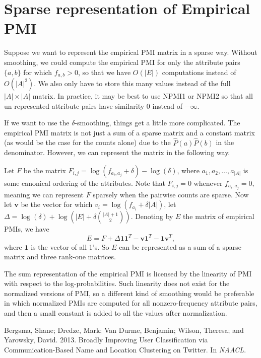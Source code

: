 \documentclass[11pt, oneside, fleqn]{article}   	%
\theoremstyle{plain}
\begin{document}
\section{Sparse representation of Empirical PMI}
Suppose we want to represent the empirical PMI matrix in a sparse way.  Without smoothing, we could compute the empirical PMI for only the attribute pairs $\{a, b\}$ for which $f_{a,b} > 0$, so that we have $O(|E|)$ computations instead of $O(|A|^2)$.  We also only have to store this many values instead of the full $|A| \times |A|$ matrix.  In practice, it may be best to use NPMI1 or NPMI2 so that all un-represented attribute pairs have similarity 0 instead of $-\infty$.

If we want to use the $\delta$-smoothing, things get a little more complicated.  The empirical PMI matrix is not just a sum of a sparse matrix and a constant matrix (as would be the case for the counts alone) due to the $\hat{P}(a) \hat{P}(b)$ in the denominator.  However, we can represent the matrix in the following way.

Let $F$ be the matrix $F_{i,j} = \log(f_{a_i,a_j} + \delta) - \log(\delta)$, where $a_1, a_2, \ldots, a_{|A|}$ is some canonical ordering of the attributes.  Note that $F_{i,j} = 0$ whenever $f_{a_i,a_j} = 0$, meaning we can represent $F$ sparsely when the pairwise counts are sparse.  Now let $\textbf{v}$ be the vector for which $v_i = \log(f_{a_i} + \delta |A|)$, let $\Delta = \log(\delta) + \log(|E| + \delta \binom{|A| + 1}{2})$.  Denoting by $E$ the matrix of empirical PMIs, we have
$$ E = F + \Delta \mathbf{1} \mathbf{1}^T - \mathbf{v} \mathbf{1}^T - \mathbf{1} \mathbf{v}^T, $$
where $\mathbf{1}$ is the vector of all 1's.  So $E$ can be represented as a sum of a sparse matrix and three rank-one matrices.  

The sum representation of the empirical PMI is licensed by the linearity of PMI with respect to the log-probabilities.  Such linearity does not exist for the normalized versions of PMI, so a different kind of smoothing would be preferable in which normalized PMIs are computed for all nonzero-frequency attribute pairs, and then a small constant is added to all the values after normalization.


\begin{thebibliography}{1}
Bergsma, Shane; Dredze, Mark; Van Durme, Benjamin; Wilson, Theresa; and Yarowsky, David.  2013.  Broadly Improving User Classification via Communication-Based Name and Location Clustering on Twitter.  In \textit{NAACL}.
\end{thebibliography}
\end{document}
